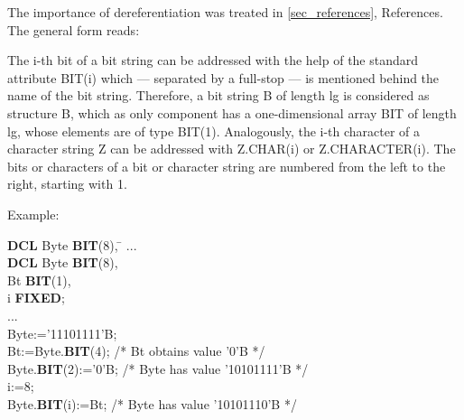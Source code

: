 
The importance of dereferentiation was treated in
 \ref{sec_references}, References. The
general form reads:



The i-th bit of a bit string can be addressed with the help of the
standard attribute BIT(i) which --- separated by a full-stop --- is mentioned
behind the name of the bit string. Therefore, a bit string B of length
lg is considered as structure B, which as only component has a
one-dimensional array BIT of length lg, whose elements are of type
BIT(1). Analogously, the i-th character of a character string Z can be
addressed with Z.CHAR(i) or Z.CHARACTER(i). The bits or characters of a
bit or character string are numbered from the left to the right, starting with 1.

Example:

\begin{tabbing}
{\bf DCL} Byte {\bf BIT}(8), \= \kill
... \> \\
{\bf DCL} Byte {\bf BIT}(8), \> \\
\x Bt {\bf BIT}(1),   \> \\
\x i {\bf FIXED};     \> \\
... \> \\
Byte:='11101111'B;            \> \\
Bt:=Byte.{\bf BIT}(4);        \> /* Bt obtains value '0'B */\\
Byte.{\bf BIT}(2):='0'B;      \> /* Byte has value '10101111'B */\\
i:=8; \> \\
Byte.{\bf BIT}(i):=Bt;        \> /* Byte has value '10101110'B */
\end{tabbing}

